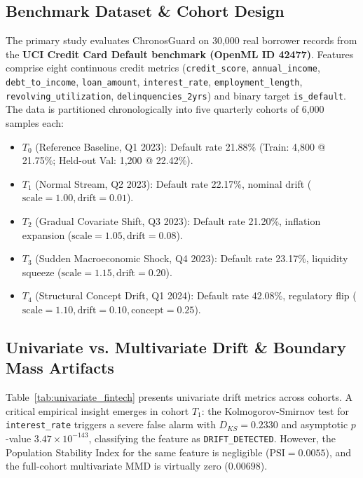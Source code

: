 \documentclass[conference]{IEEEtran}
\begin{document}
\subsection{Benchmark Dataset \& Cohort Design}
The primary study evaluates ChronosGuard on 30,000 real borrower records from the \textbf{UCI Credit Card Default benchmark (OpenML ID 42477)}. Features comprise eight continuous credit metrics (\texttt{credit\_score}, \texttt{annual\_income}, \texttt{debt\_to\_income}, \texttt{loan\_amount}, \texttt{interest\_rate}, \texttt{employment\_length}, \texttt{revolving\_utilization}, \texttt{delinquencies\_2yrs}) and binary target \texttt{is\_default}. The data is partitioned chronologically into five quarterly cohorts of 6,000 samples each:
\begin{itemize}
    \item $T_0$ (Reference Baseline, Q1 2023): Default rate 21.88\% (Train: 4,800 @ 21.75\%; Held-out Val: 1,200 @ 22.42\%).
    \item $T_1$ (Normal Stream, Q2 2023): Default rate 22.17\%, nominal drift ($\text{scale}=1.00, \text{drift}=0.01$).
    \item $T_2$ (Gradual Covariate Shift, Q3 2023): Default rate 21.20\%, inflation expansion ($\text{scale}=1.05, \text{drift}=0.08$).
    \item $T_3$ (Sudden Macroeconomic Shock, Q4 2023): Default rate 23.17\%, liquidity squeeze ($\text{scale}=1.15, \text{drift}=0.20$).
    \item $T_4$ (Structural Concept Drift, Q1 2024): Default rate 42.08\%, regulatory flip ($\text{scale}=1.10, \text{drift}=0.10, \text{concept}=0.25$).
\end{itemize}

\subsection{Univariate vs. Multivariate Drift \& Boundary Mass Artifacts}
Table~\ref{tab:univariate_fintech} presents univariate drift metrics across cohorts. A critical empirical insight emerges in cohort $T_1$: the Kolmogorov-Smirnov test for \texttt{interest\_rate} triggers a severe false alarm with $D_{KS} = 0.2330$ and asymptotic $p$-value $3.47 \times 10^{-143}$, classifying the feature as \texttt{DRIFT\_DETECTED}. However, the Population Stability Index for the same feature is negligible ($\text{PSI} = 0.0055$), and the full-cohort multivariate MMD is virtually zero ($0.00698$).
\end{document}
